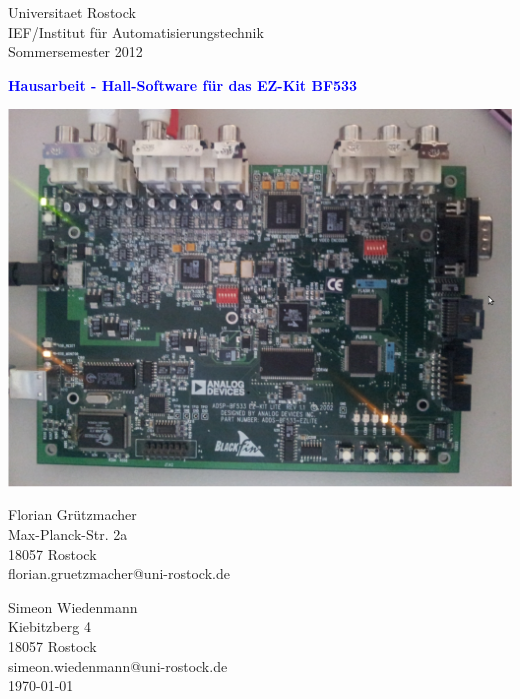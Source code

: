 \documentclass[a4paper,12pt,fontsize=12,DIV=12]{scrartcl}
\begin{document}
\begin{titlepage}
\begin{small}
\vfill {Universitaet Rostock\\ 
IEF/Institut für Automatisierungstechnik\\ 
Sommersemester 2012}
\end{small}


\begin{center}
\begin{Large}
\vfill {\textsf{\textbf{
	\textcolor{blue}{Hausarbeit - Hall-Software für das EZ-Kit BF533}
}}}
\end{Large}
\end{center}

\begin{center}
\vspace{2.0cm}
\includegraphics[scale=0.1]{Bilder/Signalprozessor.jpg}
\end{center}

\begin{small}
\vfill Florian Grützmacher \\ Max-Planck-Str. 2a \\  18057 Rostock \\  florian.gruetzmacher@uni-rostock.de\\ 
\end{small}

\vspace{-1.0cm}

\begin{small}
\vfill Simeon Wiedenmann \\ Kiebitzberg 4 \\  18057 Rostock \\  simeon.wiedenmann@uni-rostock.de\\ 
\newline
\today
\end{small}

\end{titlepage}
\end{document}
